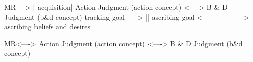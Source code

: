 \documentclass[12pt,\papersize]{extarticle}
\begin{document}
MR----> | acquisition| Action Judgment (action concept) <----> B \& D Judgment (b\&d concept)
tracking goal -----> || ascribing goal <----------------- > ascribing beliefs and desires

MR<----> Action Judgment (action concept) <----> B \& D Judgment (b\&d concept)







\end{document}
